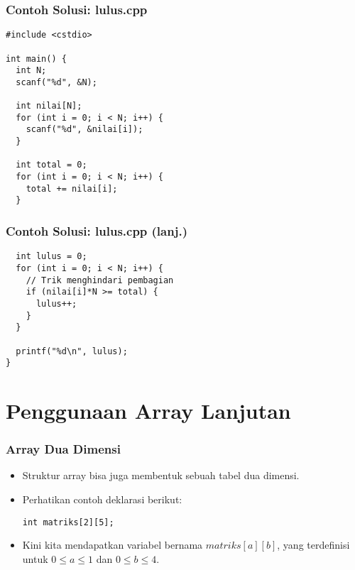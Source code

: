 \begin{frame}[fragile]
\frametitle{Contoh Solusi: lulus.cpp}
\begin{lstlisting}
#include <cstdio>

int main() {
  int N;
  scanf("%d", &N);

  int nilai[N];
  for (int i = 0; i < N; i++) {
    scanf("%d", &nilai[i]);
  }

  int total = 0;
  for (int i = 0; i < N; i++) {
    total += nilai[i];
  }
\end{lstlisting}
\end{frame}

\begin{frame}[fragile]
\frametitle{Contoh Solusi: lulus.cpp (lanj.)}
\begin{lstlisting}
  int lulus = 0;
  for (int i = 0; i < N; i++) {
    // Trik menghindari pembagian
    if (nilai[i]*N >= total) {
      lulus++;
    }
  }

  printf("%d\n", lulus);
}
\end{lstlisting}
\end{frame}

\section{Penggunaan Array Lanjutan}
\frame{\sectionpage}

\begin{frame}[fragile]
\frametitle{Array Dua Dimensi}
\begin{itemize}
  \item Struktur array bisa juga membentuk sebuah tabel dua dimensi.
  \item Perhatikan contoh deklarasi berikut:
\begin{lstlisting}
int matriks[2][5];
\end{lstlisting}
  \item Kini kita mendapatkan variabel bernama $matriks[a][b]$, yang terdefinisi untuk $0 \le a \le 1$ dan $0 \le b \le 4$.
\end{itemize}
\end{frame}

